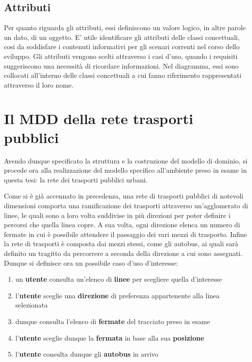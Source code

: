 \subsection{Attributi} %
\label{sub:attributi_mod}

Per quanto riguarda gli attributi, essi definiscono un valore logico, in altre parole un dato, di un oggetto. E' utile identificare gli attributi delle classi concettuali, cosi da soddisfare i contenuti informativi per gli scenari correnti nel corso dello sviluppo.
Gli attributi vengono scelti attraverso i casi d'uso, quando i requisiti suggeriscono una necessità di ricordare informazioni. Nel diagramma, essi sono collocati all'interno delle classi concettuali a cui fanno riferimento rappresentati attraverso il loro nome.

\section{Il MDD della rete trasporti pubblici} %
\label{sec:il_MDD_della_rete_trasporti_pubblici}

Avendo dunque specificato la struttura e la costruzione del modello di dominio, si procede ora alla realizzazione del modello specifico all'ambiente preso in esame in questa tesi: la rete dei trasporti pubblici urbani.

Come si è già accennato in precedenza, una rete di trasporti pubblici di notevoli dimensioni comporta una ramificazione dei trasporti attraverso un'agglomerato di linee, le quali sono a loro volta suddivise in più direzioni per poter definire i percorsi che quella linea copre.
A sua volta, ogni direzione elenca un numero di fermate in cui è possibile attendere il passaggio dei vari mezzi di trasporto. Infine la rete di trasporti è composta dai mezzi stessi, come gli autobus, ai quali sarà definito un tragitto da percorrere a seconda della direzione a cui sono assegnati.
\newpage
Dunque si definisce ora un possibile caso d'uso d'interesse:
\begin{enumerate}
   \item un {\bfseries utente} consulta un'elenco di {\bfseries linee} per scegliere quella d'interesse
   \item l'{\bfseries utente} sceglie una {\bfseries direzione} di preferenza appartenente alla linea selezionata
   \item dunque consulta l'elenco di {\bfseries fermate} del tracciato preso in esame
   \item l'{\bfseries utente} sceglie dunque la {\bfseries fermata} in base alla sua {\bfseries posizione}
   \item l'{\bfseries utente} consulta dunque gli {\bfseries autobus} in arrivo
\end{enumerate}

